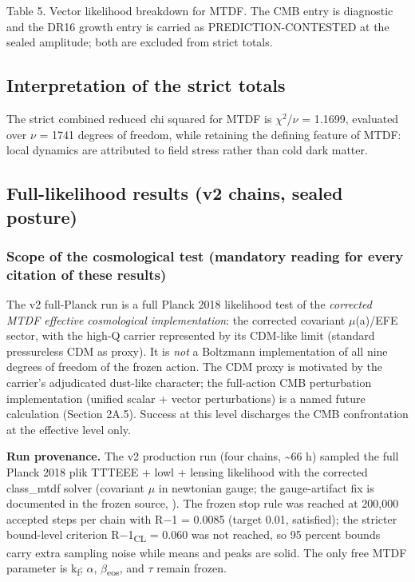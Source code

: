 \documentclass[11pt,a4paper]{article}
\begin{document}
Table 5. Vector likelihood breakdown for MTDF. The CMB entry is diagnostic and the DR16 growth entry is carried as PREDICTION-CONTESTED at the sealed amplitude; both are excluded from strict totals.

\subsection{Interpretation of the strict totals}
The strict combined reduced chi squared for MTDF is $\chi$$^{2}$/$\nu$ = 1.1699, evaluated over $\nu$ = 1741 degrees of freedom, while retaining the defining feature of MTDF: local dynamics are attributed to field stress rather than cold dark matter.

\subsection{Full-likelihood results (v2 chains, sealed posture)}

\begin{mdframed}[linecolor=accent,linewidth=0.5pt,backgroundcolor=callout-bg,leftline=true,rightline=true,topline=true,bottomline=true,innerleftmargin=8pt,innerrightmargin=8pt,innertopmargin=6pt,innerbottommargin=6pt]
\subsubsection*{Scope of the cosmological test (mandatory reading for every citation of these results)}
The v2 full-Planck run is a full Planck 2018 likelihood test of the \emph{corrected MTDF effective cosmological implementation}: the corrected covariant $\mu$(a)/\allowbreak{}EFE sector, with the high-Q carrier represented by its CDM-like limit (standard pressureless CDM as proxy). It is \emph{not} a Boltzmann implementation of all nine degrees of freedom of the frozen action. The CDM proxy is motivated by the carrier's adjudicated dust-like character; the full-action CMB perturbation implementation (unified scalar + vector perturbations) is a named future calculation (Section 2A.5). Success at this level discharges the CMB confrontation at the effective level only.
\end{mdframed}

\textbf{Run provenance.} The v2 production run (four chains, \~{}66 h) sampled the full Planck 2018 plik TTTEEE + lowl + lensing likelihood with the corrected class\_\allowbreak{}mtdf solver (covariant $\mu$ in newtonian gauge; the gauge-artifact fix is documented in the frozen source, \texttt{{\small\protect{}}}). The frozen stop rule was reached at 200,000 accepted steps per chain with R$-$1 = 0.0085 (target 0.01, satisfied); the stricter bound-level criterion R$-$1\textsubscript{CL} = 0.060 was not reached, so 95 percent bounds carry extra sampling noise while means and peaks are solid. The only free MTDF parameter is k\textsubscript{f}; $\alpha$, $\beta$\textsubscript{eos}, and $\tau$ remain frozen.
\end{document}
